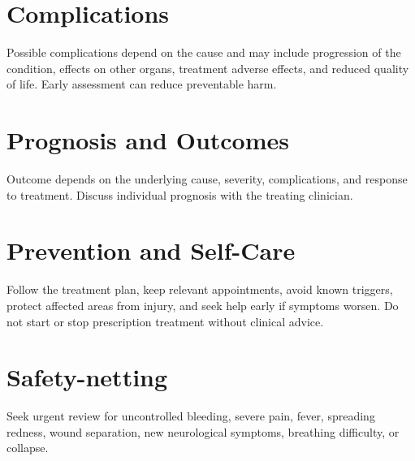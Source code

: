 \section*{Complications}
Possible complications depend on the cause and may include progression of the condition, effects on other organs, treatment adverse effects, and reduced quality of life. Early assessment can reduce preventable harm.

\section*{Prognosis and Outcomes}
Outcome depends on the underlying cause, severity, complications, and response to treatment. Discuss individual prognosis with the treating clinician.

\section*{Prevention and Self-Care}
Follow the treatment plan, keep relevant appointments, avoid known triggers, protect affected areas from injury, and seek help early if symptoms worsen. Do not start or stop prescription treatment without clinical advice.
\section*{Safety-netting}
Seek urgent review for uncontrolled bleeding, severe pain, fever, spreading redness, wound separation, new neurological symptoms, breathing difficulty, or collapse.
